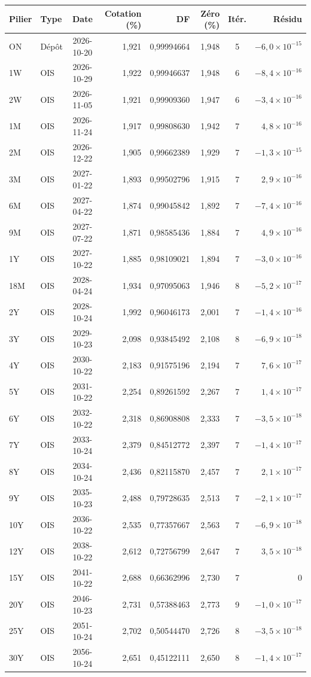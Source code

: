 \begin{tabular}{@{}llcrrrcr@{}}
\toprule
Pilier & Type & Date & Cotation (\%) & DF & Zéro (\%) & Itér. & Résidu \\
\midrule
ON & Dépôt & 2026-10-20 & 1{,}921 & 0{,}99994664 & 1{,}948 & 5 & $-6{,}0\times10^{-15}$ \\
1W & OIS & 2026-10-29 & 1{,}922 & 0{,}99946637 & 1{,}948 & 6 & $-8{,}4\times10^{-16}$ \\
2W & OIS & 2026-11-05 & 1{,}921 & 0{,}99909360 & 1{,}947 & 6 & $-3{,}4\times10^{-16}$ \\
1M & OIS & 2026-11-24 & 1{,}917 & 0{,}99808630 & 1{,}942 & 7 & $4{,}8\times10^{-16}$ \\
2M & OIS & 2026-12-22 & 1{,}905 & 0{,}99662389 & 1{,}929 & 7 & $-1{,}3\times10^{-15}$ \\
3M & OIS & 2027-01-22 & 1{,}893 & 0{,}99502796 & 1{,}915 & 7 & $2{,}9\times10^{-16}$ \\
6M & OIS & 2027-04-22 & 1{,}874 & 0{,}99045842 & 1{,}892 & 7 & $-7{,}4\times10^{-16}$ \\
9M & OIS & 2027-07-22 & 1{,}871 & 0{,}98585436 & 1{,}884 & 7 & $4{,}9\times10^{-16}$ \\
1Y & OIS & 2027-10-22 & 1{,}885 & 0{,}98109021 & 1{,}894 & 7 & $-3{,}0\times10^{-16}$ \\
18M & OIS & 2028-04-24 & 1{,}934 & 0{,}97095063 & 1{,}946 & 8 & $-5{,}2\times10^{-17}$ \\
2Y & OIS & 2028-10-24 & 1{,}992 & 0{,}96046173 & 2{,}001 & 7 & $-1{,}4\times10^{-16}$ \\
3Y & OIS & 2029-10-23 & 2{,}098 & 0{,}93845492 & 2{,}108 & 8 & $-6{,}9\times10^{-18}$ \\
4Y & OIS & 2030-10-22 & 2{,}183 & 0{,}91575196 & 2{,}194 & 7 & $7{,}6\times10^{-17}$ \\
5Y & OIS & 2031-10-22 & 2{,}254 & 0{,}89261592 & 2{,}267 & 7 & $1{,}4\times10^{-17}$ \\
6Y & OIS & 2032-10-22 & 2{,}318 & 0{,}86908808 & 2{,}333 & 7 & $-3{,}5\times10^{-18}$ \\
7Y & OIS & 2033-10-24 & 2{,}379 & 0{,}84512772 & 2{,}397 & 7 & $-1{,}4\times10^{-17}$ \\
8Y & OIS & 2034-10-24 & 2{,}436 & 0{,}82115870 & 2{,}457 & 7 & $2{,}1\times10^{-17}$ \\
9Y & OIS & 2035-10-23 & 2{,}488 & 0{,}79728635 & 2{,}513 & 7 & $-2{,}1\times10^{-17}$ \\
10Y & OIS & 2036-10-22 & 2{,}535 & 0{,}77357667 & 2{,}563 & 7 & $-6{,}9\times10^{-18}$ \\
12Y & OIS & 2038-10-22 & 2{,}612 & 0{,}72756799 & 2{,}647 & 7 & $3{,}5\times10^{-18}$ \\
15Y & OIS & 2041-10-22 & 2{,}688 & 0{,}66362996 & 2{,}730 & 7 & $0$ \\
20Y & OIS & 2046-10-23 & 2{,}731 & 0{,}57388463 & 2{,}773 & 9 & $-1{,}0\times10^{-17}$ \\
25Y & OIS & 2051-10-24 & 2{,}702 & 0{,}50544470 & 2{,}726 & 8 & $-3{,}5\times10^{-18}$ \\
30Y & OIS & 2056-10-24 & 2{,}651 & 0{,}45122111 & 2{,}650 & 8 & $-1{,}4\times10^{-17}$ \\
\bottomrule
\end{tabular}
